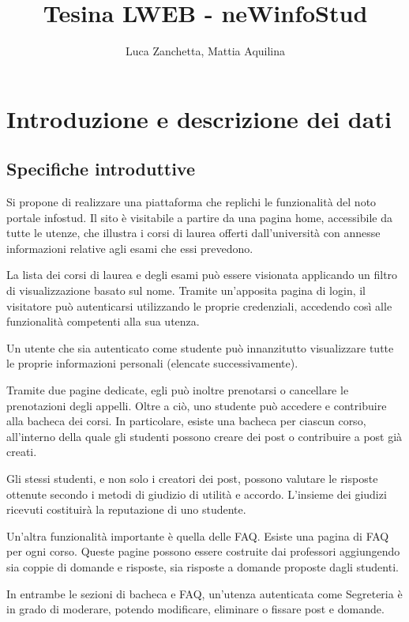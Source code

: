 \documentclass [a4paper,11pt]{book}
\begin{document}
\author{Luca Zanchetta, Mattia Aquilina}
\title{Tesina LWEB - neWinfoStud}
\maketitle
\tableofcontents

\chapter{Introduzione e descrizione dei dati}

\section{Specifiche introduttive}
\label{sec:specifiche}

Si propone di realizzare una piattaforma che replichi le funzionalità del noto portale infostud. Il sito è visitabile a partire da una pagina home, accessibile da tutte le utenze, che illustra i corsi di laurea offerti dall’università con annesse informazioni relative agli esami che essi prevedono.
  
La lista dei corsi di laurea e degli esami può essere visionata applicando un filtro di visualizzazione basato sul nome.
Tramite un’apposita pagina di login, il visitatore può autenticarsi utilizzando le proprie credenziali, accedendo così alle funzionalità competenti alla sua utenza.

Un utente che sia autenticato come studente può innanzitutto visualizzare tutte le proprie informazioni personali (elencate successivamente). 

Tramite due pagine dedicate, egli può inoltre prenotarsi o cancellare le prenotazioni degli appelli. Oltre a ciò, uno studente può accedere e contribuire alla bacheca dei corsi. In particolare, esiste una bacheca per ciascun corso, all’interno della quale gli studenti possono creare dei post o contribuire a post già creati. 

Gli stessi studenti, e non solo i creatori dei post, possono valutare le risposte ottenute secondo i metodi di giudizio di utilità e accordo. L’insieme dei giudizi ricevuti costituirà la reputazione di uno studente.

Un’altra funzionalità importante è quella delle FAQ. Esiste una pagina di FAQ per ogni corso. Queste pagine possono essere costruite dai professori aggiungendo sia coppie di domande e risposte, sia risposte a domande proposte dagli studenti.

In entrambe le sezioni di bacheca e FAQ, un’utenza autenticata come Segreteria è in grado di moderare, potendo modificare, eliminare o fissare post e domande.
\end{document}
